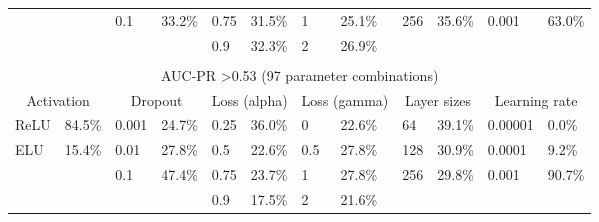 \documentclass[ppgc, diss, english]{iiufrgs}
\begin{document}
\begin{table}[!th]
\begin{adjustbox}{scale=0.9,center}
\begin{tabular}{llllllllllll}
              &                & 0.1          & 33.2\%       & 0.75           & 31.5\%          & 1             & 25.1\%           & 256           & 35.6\%          & 0.001            & 63.0\%         \\
              &                &              &              & 0.9            & 32.3\%          & 2             & 26.9\%           &               &                 &                  &                \\
              &                &              &              &                &                 &               &                  &               &                 &                  &                \\ \hline
\multicolumn{12}{c}{AUC-PR \textgreater 0.53 (97 parameter combinations)}                                                                                                                                \\ \hline
\multicolumn{2}{c}{Activation} & \multicolumn{2}{c}{Dropout} & \multicolumn{2}{c}{Loss (alpha)} & \multicolumn{2}{c}{Loss (gamma)} & \multicolumn{2}{c}{Layer sizes} & \multicolumn{2}{c}{Learning rate} \\
ReLU          & 84.5\%         & 0.001        & 24.7\%       & 0.25           & 36.0\%          & 0             & 22.6\%           & 64            & 39.1\%          & 0.00001          & 0.0\%          \\
ELU           & 15.4\%         & 0.01         & 27.8\%       & 0.5            & 22.6\%          & 0.5           & 27.8\%           & 128           & 30.9\%          & 0.0001           & 9.2\%          \\
              &                & 0.1          & 47.4\%       & 0.75           & 23.7\%          & 1             & 27.8\%           & 256           & 29.8\%          & 0.001            & 90.7\%         \\
              &                &              &              & 0.9            & 17.5\%          & 2             & 21.6\%           &               &                 &                  &                \\ \hline
\end{tabular}
\end{adjustbox}
\end{table}
\end{document}
